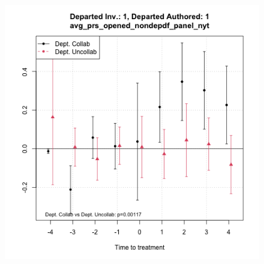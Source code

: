 \begin{figure}[htbp]
\begin{minipage}[b]{0.49\textwidth}
    \label{fig:prs_opened_predep}
    \end{minipage}
    \hfill
    \begin{minipage}[b]{0.49\textwidth}
        \centering
        \includegraphics[width=\textwidth]{temp/output/collab_imp/auth1_inv1_cs_norm_avg_prs_opened_nondep.png}
    \label{fig:avg_prs_opened_nondep}


\end{minipage}
\end{figure}
